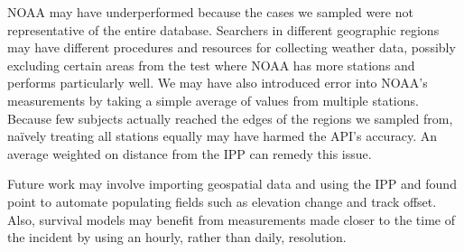 \documentclass[12pt]{article}
\begin{document}
    NOAA may have underperformed because the cases we sampled were not
    representative of the entire database. Searchers in different geographic
    regions may have different procedures and resources for collecting weather
    data, possibly excluding certain areas from the test where NOAA has more
    stations and performs particularly well. We may have also introduced error
    into NOAA's measurements by taking a simple average of values from multiple
    stations. Because few subjects actually reached the edges of the regions we
    sampled from, na\"{i}vely treating all stations equally may have harmed
    the API's accuracy. An average weighted on distance from the IPP can remedy
    this issue.

    Future work may involve importing geospatial data and using the IPP and
    found point to automate populating fields such as elevation change and
    track offset. Also, survival models may benefit from measurements made
    closer to the time of the incident by using an hourly, rather than daily,
    resolution.

  
  
\end{document}
